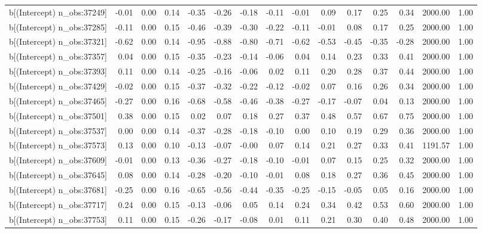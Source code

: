 \begin{table}[ht]
\begin{tabular}{rrrrrrrrrrrrrrr}
  b[(Intercept) n\_obs:37249] & -0.01 & 0.00 & 0.14 & -0.35 & -0.26 & -0.18 & -0.11 & -0.01 & 0.09 & 0.17 & 0.25 & 0.34 & 2000.00 & 1.00 \\ 
  b[(Intercept) n\_obs:37285] & -0.11 & 0.00 & 0.15 & -0.46 & -0.39 & -0.30 & -0.22 & -0.11 & -0.01 & 0.08 & 0.17 & 0.25 & 2000.00 & 1.00 \\ 
  b[(Intercept) n\_obs:37321] & -0.62 & 0.00 & 0.14 & -0.95 & -0.88 & -0.80 & -0.71 & -0.62 & -0.53 & -0.45 & -0.35 & -0.28 & 2000.00 & 1.00 \\ 
  b[(Intercept) n\_obs:37357] & 0.04 & 0.00 & 0.15 & -0.35 & -0.23 & -0.14 & -0.06 & 0.04 & 0.14 & 0.23 & 0.33 & 0.41 & 2000.00 & 1.00 \\ 
  b[(Intercept) n\_obs:37393] & 0.11 & 0.00 & 0.14 & -0.25 & -0.16 & -0.06 & 0.02 & 0.11 & 0.20 & 0.28 & 0.37 & 0.44 & 2000.00 & 1.00 \\ 
  b[(Intercept) n\_obs:37429] & -0.02 & 0.00 & 0.15 & -0.37 & -0.32 & -0.22 & -0.12 & -0.02 & 0.07 & 0.16 & 0.26 & 0.34 & 2000.00 & 1.00 \\ 
  b[(Intercept) n\_obs:37465] & -0.27 & 0.00 & 0.16 & -0.68 & -0.58 & -0.46 & -0.38 & -0.27 & -0.17 & -0.07 & 0.04 & 0.13 & 2000.00 & 1.00 \\ 
  b[(Intercept) n\_obs:37501] & 0.38 & 0.00 & 0.15 & 0.02 & 0.07 & 0.18 & 0.27 & 0.37 & 0.48 & 0.57 & 0.67 & 0.75 & 2000.00 & 1.00 \\ 
  b[(Intercept) n\_obs:37537] & 0.00 & 0.00 & 0.14 & -0.37 & -0.28 & -0.18 & -0.10 & 0.00 & 0.10 & 0.19 & 0.29 & 0.36 & 2000.00 & 1.00 \\ 
  b[(Intercept) n\_obs:37573] & 0.13 & 0.00 & 0.10 & -0.13 & -0.07 & -0.00 & 0.07 & 0.14 & 0.21 & 0.27 & 0.33 & 0.41 & 1191.57 & 1.00 \\ 
  b[(Intercept) n\_obs:37609] & -0.01 & 0.00 & 0.13 & -0.36 & -0.27 & -0.18 & -0.10 & -0.01 & 0.07 & 0.15 & 0.25 & 0.32 & 2000.00 & 1.00 \\ 
  b[(Intercept) n\_obs:37645] & 0.08 & 0.00 & 0.14 & -0.28 & -0.20 & -0.10 & -0.01 & 0.08 & 0.18 & 0.27 & 0.36 & 0.45 & 2000.00 & 1.00 \\ 
  b[(Intercept) n\_obs:37681] & -0.25 & 0.00 & 0.16 & -0.65 & -0.56 & -0.44 & -0.35 & -0.25 & -0.15 & -0.05 & 0.05 & 0.16 & 2000.00 & 1.00 \\ 
  b[(Intercept) n\_obs:37717] & 0.24 & 0.00 & 0.15 & -0.13 & -0.06 & 0.05 & 0.14 & 0.24 & 0.34 & 0.42 & 0.53 & 0.60 & 2000.00 & 1.00 \\ 
  b[(Intercept) n\_obs:37753] & 0.11 & 0.00 & 0.15 & -0.26 & -0.17 & -0.08 & 0.01 & 0.11 & 0.21 & 0.30 & 0.40 & 0.48 & 2000.00 & 1.00 \\ 

\end{tabular}
\end{table}
